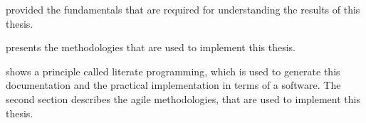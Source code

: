 \documentclass[%
    a4paper,    %
    justified,  %
    nobib,      %
    openany     %
]{tufte-book}
\begin{document}

 provided the fundamentals that are required for
understanding the results of this thesis.

 presents the methodologies that are used to implement
this thesis.

 shows a principle called literate
programming, which is used to generate this documentation and the practical
implementation in terms of a software. The second section describes the agile
methodologies, that are used to implement this thesis.
\end{document}
